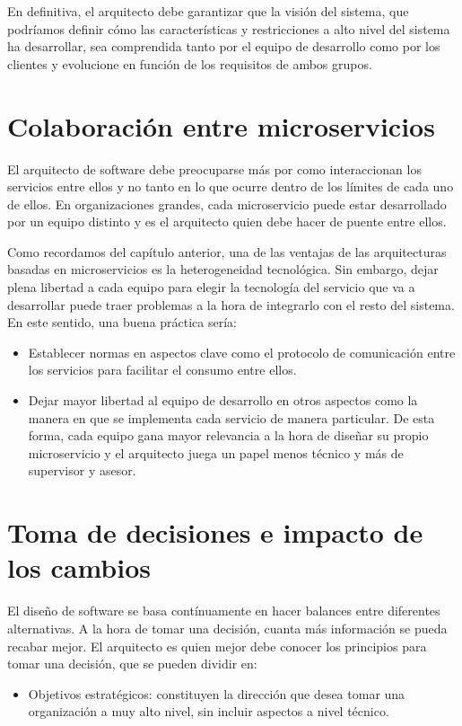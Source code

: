 \documentclass[11pt,a4paper]{article}
\begin{document}
En definitiva, el arquitecto debe garantizar que la visión del sistema, que podríamos definir cómo las características y restricciones a alto nivel del sistema ha desarrollar, sea comprendida tanto por el equipo de desarrollo como por los clientes y evolucione en función de los requisitos de ambos grupos.

\section{Colaboración entre microservicios}

El arquitecto de software debe preocuparse más por como interaccionan los servicios entre ellos y no tanto en lo que ocurre dentro de los límites de cada uno de ellos. En organizaciones grandes, cada microservicio puede estar desarrollado por un equipo distinto y es el arquitecto quien debe hacer de puente entre ellos.

Como recordamos del capítulo anterior, una de las ventajas de las arquitecturas basadas en microservicios es la heterogeneidad tecnológica.  Sin embargo, dejar plena libertad a cada equipo para elegir la tecnología del servicio que va a desarrollar puede traer problemas a la hora de integrarlo con el resto del sistema. En este sentido, una buena práctica sería:

\begin{itemize}

\item Establecer normas en aspectos clave como el protocolo de comunicación entre los servicios para facilitar el consumo entre ellos.

\item Dejar mayor libertad al equipo de desarrollo en otros aspectos como la manera en que se implementa cada servicio de manera particular. De esta forma, cada equipo gana mayor relevancia a la hora de diseñar su propio microservicio y el arquitecto juega un papel menos técnico y más de supervisor y asesor.

\end{itemize}

\section{Toma de decisiones e impacto de los cambios}

El diseño de software se basa contínuamente en hacer balances entre diferentes alternativas. A la hora de tomar una decisión, cuanta más información se pueda recabar mejor. El arquitecto es quien mejor debe conocer los principios para tomar una decisión, que se pueden dividir en:

\begin{itemize}
\item Objetivos estratégicos: constituyen la dirección que desea tomar una organización a muy alto nivel, sin incluir aspectos a nivel técnico.
\end{itemize}
\end{document}
